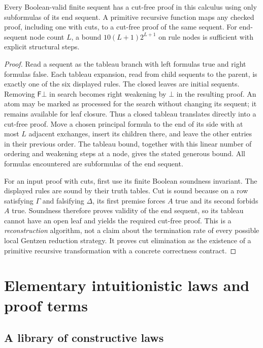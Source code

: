 \begin{theorem}\label{thm:cut}
Every Boolean-valid finite sequent has a cut-free proof in this calculus
using only subformulas of its end sequent. A primitive recursive function
maps any checked proof, including one with cuts, to a cut-free proof of the
same sequent. For end-sequent node count $L$, a bound
$10(L+1)2^{L+1}$ on rule nodes is sufficient with explicit structural steps.
\end{theorem}
\begin{proof}
Read a sequent as the tableau branch with left formulas true and right
formulas false. Each tableau expansion, read from child sequents to the
parent, is exactly one of the six displayed rules. The closed leaves are
initial sequents. Removing $\mathsf F\bot$ in search becomes right weakening
by $\bot$ in the resulting proof. An atom may be marked as processed for
the search without changing its sequent; it remains available for leaf
closure. Thus a closed tableau translates directly into a cut-free proof.
Move a chosen principal formula to the end of its side with at most $L$
adjacent exchanges, insert its children there, and leave the other entries
in their previous order. The tableau bound, together with this linear
number of ordering and weakening steps at a node, gives the stated generous bound. All formulas
encountered are subformulas of the end sequent.

For an input proof with cuts, first use its finite Boolean soundness
invariant. The displayed rules are sound by their truth tables. Cut is
sound because on a row satisfying $\Gamma$ and falsifying $\Delta$, its
first premise forces $A$ true and its second forbids $A$ true. Soundness
therefore proves validity of the end sequent, so its tableau cannot have
an open leaf and yields the required cut-free proof. This is a
\emph{reconstruction} algorithm, not a claim about the termination rate of
every possible local Gentzen reduction strategy. It proves cut elimination
as the existence of a primitive recursive transformation with a concrete
correctness contract.
\end{proof}

\section{Elementary intuitionistic laws and proof terms}\label{sec:laws}

\subsection{A library of constructive laws}

